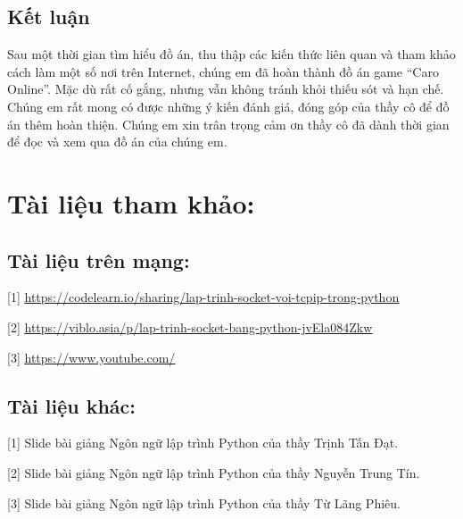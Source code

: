 \documentclass[a4paper]{article}
\begin{document}
\hypertarget{kux1ebft-luux1eadn}{%
\subsection{Kết luận}\label{kux1ebft-luux1eadn}}

Sau một thời gian tìm hiểu đồ án, thu thập các kiến thức liên quan và
tham khảo cách làm một số nơi trên Internet, chúng em đã hoàn thành đồ
án game ``Caro Online''. Mặc dù rất cố gắng, nhưng vẫn không tránh khỏi
thiếu sót và hạn chế. Chúng em rất mong có được những ý kiến đánh giá,
đóng góp của thầy cô để đồ án thêm hoàn thiện. Chúng em xin trân trọng
cảm ơn thầy cô đã dành thời gian để đọc và xem qua đồ án của chúng em.


\clearpage
\hypertarget{phux1ea7n-ii.-nux1ed9i-dung}{%
\section{Tài liệu tham khảo:}\label{phux1ea7n-ii.-nux1ed9i-dung}}
\hypertarget{giux1edbi-thiux1ec7u-ux111ux1ec1-tuxe0i}{%
\subsection{\texorpdfstring{Tài liệu trên mạng: 
}{Tài liệu trên mạng: }}\label{giux1edbi-thiux1ec7u-ux111ux1ec1-tuxe0i}}
\begin{flushleft}
{[}1{]}
\href{https://codelearn.io/sharing/lap-trinh-socket-voi-tcpip-trong-python}{\uline{https://codelearn.io/sharing/lap-trinh-socket-voi-tcpip-trong-python}}

{[}2{]}
\href{https://viblo.asia/p/lap-trinh-socket-bang-python-jvEla084Zkw}{\uline{https://viblo.asia/p/lap-trinh-socket-bang-python-jvEla084Zkw}}

{[}3{]}
\href{https://www.youtube.com/}{\uline{https://www.youtube.com/}}

\end{flushleft}
\hypertarget{giux1edbi-thiux1ec7u-ux111ux1ec1-tuxe0i}{%
\subsection{\texorpdfstring{Tài liệu khác: 
}{Tài liệu khác: }}\label{giux1edbi-thiux1ec7u-ux111ux1ec1-tuxe0i}}
\begin{flushleft}
{[}1{]} Slide bài giảng Ngôn ngữ lập trình Python của thầy Trịnh Tấn Đạt.

{[}2{]} Slide bài giảng Ngôn ngữ lập trình Python của thầy Nguyễn Trung
Tín.

{[}3{]} Slide bài giảng Ngôn ngữ lập trình Python của thầy Từ Lãng Phiêu.
\end{flushleft}
\end{document}
